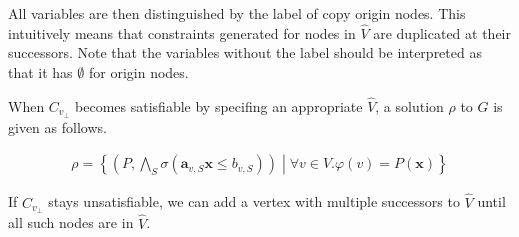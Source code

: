 \documentclass[a4paper,12pt]{article}
\begin{document}
All variables are then distinguished by the label of copy origin
nodes. This intuitively means that constraints generated for nodes in
$\hat V$ are duplicated at their successors. Note that the variables
without the label should be interpreted as that it has $\emptyset$ for
origin nodes.

When $C_{v_\bot}$ becomes satisfiable by specifing an appropriate
$\hat V$, a solution $\rho$ to $G$ is given as follows.

\begin{align*}
 \rho = \left\lbrace
  \left( P, \bigwedge_S \sigma(\mathbf{a}_{v,S} \mathbf{x} \leq b_{v,S}) \right) \middle|
  \forall v \in V. \varphi(v) = P(\mathbf{x})
 \right\rbrace
\end{align*}

If $C_{v_\bot}$ stays unsatisfiable, we can add a vertex with multiple
successors to $\hat V$ until all such nodes are in $\hat V$.
\end{document}
